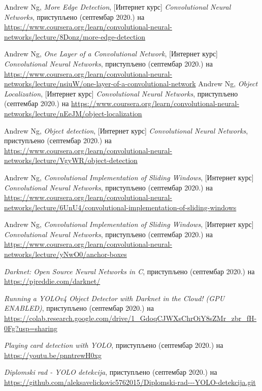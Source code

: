 \documentclass[12pt, а4paper]{article}
\begin{document}
\begin{thebibliography}{99}
Andrew Ng, \textit{More Edge Detection}, [Интернет курс] \textit{Convolutional
Neural Networks}, приступљено (септембар 2020.) на
\url{https://www.coursera.org/learn/convolutional-neural-networks/lecture/8Donz/more-edge-detection}

Andrew Ng, \textit{One Layer of a Convolutional Network}, [Интернет курс] \textit{Convolutional
Neural Networks}, приступљено (септембар 2020.) на
\url{https://www.coursera.org/learn/convolutional-neural-networks/lecture/nsiuW/one-layer-of-a-convolutional-network}
Andrew Ng, \textit{Object Localization}, [Интернет курс] \textit{Convolutional
Neural Networks}, приступљено (септембар 2020.) на
\url{https://www.coursera.org/learn/convolutional-neural-networks/lecture/nEeJM/object-localization}

Andrew Ng, \textit{Object detection}, [Интернет курс] \textit{Convolutional
Neural Networks}, приступљено (септембар 2020.) на
\url{https://www.coursera.org/learn/convolutional-neural-networks/lecture/VgyWR/object-detection}

Andrew Ng, \textit{Convolutional Implementation of Sliding Windows}, [Интернет курс] \textit{Convolutional
Neural Networks}, приступљено (септембар 2020.) на
\url{https://www.coursera.org/learn/convolutional-neural-networks/lecture/6UnU4/convolutional-implementation-of-sliding-windows}

Andrew Ng, \textit{Convolutional Implementation of Sliding Windows}, [Интернет курс] \textit{Convolutional
Neural Networks}, приступљено (септембар 2020.) на
\url{https://www.coursera.org/learn/convolutional-neural-networks/lecture/yNwO0/anchor-boxes}

\textit{Darknet: Open Source Neural Networks in C}, приступљено (септембар 2020.) на
\url{https://pjreddie.com/darknet/}

\textit{Running a YOLOv4 Object Detector with Darknet in the Cloud! (GPU ENABLED)}, приступљено (септембар 2020.) на
\url{https://colab.research.google.com/drive/1_GdoqCJWXsChrOiY8sZMr_zbr_fH-0Fg?usp=sharing}

\textit{Playing card detection with YOLO}, приступљено (септембар 2020.) на
\url{https://youtu.be/pnntrewH0xg}

\textit{Diplomski rad - YOLO detekcija}, приступљено (септембар 2020.) на
\url{https://github.com/aleksavelickovic5762015/Diplomski-rad---YOLO-detekcija.git}

\end{thebibliography}

\endgroup
\end{document}

